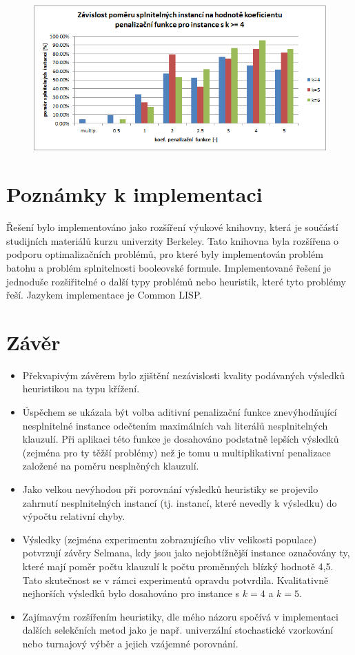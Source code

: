 \documentclass[12pt,oneside,a4paper]{article}
\begin{document}
\begin{figure}[ht]
\centering
\includegraphics[scale=0.9]{obr/pen-sat-max.png}
\end{figure}
\FloatBarrier
\newpage

\section{Poznámky k implementaci}

Řešení bylo implementováno jako rozšíření výukové knihovny, která je součástí studijních materiálů kurzu  univerzity Berkeley. Tato knihovna byla rozšířena o podporu optimalizačních problémů, pro které byly implementován problém batohu a problém splnitelnosti booleovské formule. Implementované řešení je jednoduše rozšiřitelné o další typy problémů nebo heuristik, které tyto problémy řeší. Jazykem implementace je Common LISP.


\section{Závěr}
\begin{itemize}
\item Překvapivým závěrem bylo zjištění nezávislosti kvality podávaných výsledků heuristikou na typu křížení.
\item Úspěchem se ukázala být volba aditivní penalizační funkce znevýhodňující nesplnitelné instance odečtením maximálních vah literálů nesplnitelných klauzulí. Při aplikaci této funkce je dosahováno podstatně lepších výsledků (zejména pro ty těžší problémy) než je tomu u multiplikativní penalizace založené na poměru nesplněných klauzulí.
\item Jako velkou nevýhodou při porovnání výsledků heuristiky se projevilo zahrnutí nesplnitelných instancí (tj. instancí, které nevedly k výsledku) do výpočtu relativní chyby.
\item Výsledky (zejména experimentu zobrazujícího vliv velikosti populace) potvrzují závěry Selmana, kdy jsou jako nejobtížnější instance označovány ty, které mají poměr počtu klauzulí k počtu proměnných blízký hodnotě 4,5. Tato skutečnost se v rámci experimentů opravdu potvrdila. Kvalitativně nejhorších výsledků bylo dosahováno pro instance s $k=4$ a $k=5$.
\item Zajímavým rozšířením heuristiky, dle mého názoru spočívá v implementaci dalších selekčních metod jako je např. univerzální stochastické vzorkování nebo turnajový výběr a jejich vzájemné porovnání.

\end{itemize}
\end{document}
